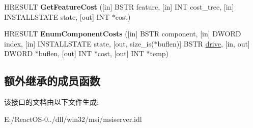 \begin{DoxyCompactItemize}
H\+R\+E\+S\+U\+LT {\bfseries Get\+Feature\+Cost} (\mbox{[}in\mbox{]} B\+S\+TR feature, \mbox{[}in\mbox{]} I\+NT cost\+\_\+tree, \mbox{[}in\mbox{]} I\+N\+S\+T\+A\+L\+L\+S\+T\+A\+TE state, \mbox{[}out\mbox{]} I\+NT $\ast$cost)
\item 
\mbox{\label{interface_i_wine_msi_remote_package_ab2e5f09cc75792e6fb367c7c4bbec4c2}} 
H\+R\+E\+S\+U\+LT {\bfseries Enum\+Component\+Costs} (\mbox{[}in\mbox{]} B\+S\+TR component, \mbox{[}in\mbox{]} D\+W\+O\+RD index, \mbox{[}in\mbox{]} I\+N\+S\+T\+A\+L\+L\+S\+T\+A\+TE state, \mbox{[}out, size\+\_\+is($\ast$buflen)\mbox{]} B\+S\+TR \hyperlink{structdrive}{drive}, \mbox{[}in, out\mbox{]} D\+W\+O\+RD $\ast$buflen, \mbox{[}out\mbox{]} I\+NT $\ast$cost, \mbox{[}out\mbox{]} I\+NT $\ast$temp)
\end{DoxyCompactItemize}
\subsection*{额外继承的成员函数}


该接口的文档由以下文件生成\+:\begin{DoxyCompactItemize}
\item 
E\+:/\+React\+O\+S-\/0../dll/win32/msi/msiserver.\+idl\end{DoxyCompactItemize}
